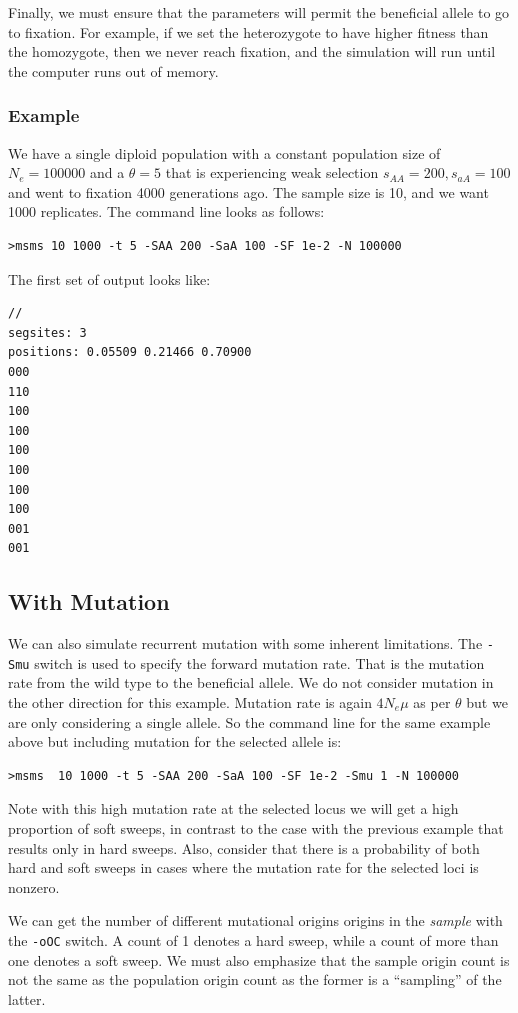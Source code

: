\documentclass{article}
\begin{document}
Finally, we must ensure that the parameters will permit the beneficial allele to
go to fixation. For example, if we set the heterozygote to have higher fitness
than the homozygote, then we never reach fixation, and the simulation will run
until the computer runs out of memory. 

\subsubsection{Example}
We have a single diploid population with a constant population size of
$N_e=100000$ and  a $\theta=5$ that is experiencing weak selection
$s_{AA}=200,s_{aA}=100$ and went to fixation 4000 generations ago. The sample
size is 10, and we want 1000 replicates. The command line looks as follows:
\begin{verbatim}
>msms 10 1000 -t 5 -SAA 200 -SaA 100 -SF 1e-2 -N 100000 
\end{verbatim}
The first set of output looks like:
\begin{verbatim}
//
segsites: 3
positions: 0.05509 0.21466 0.70900
000
110
100
100
100
100
100
100
001
001
\end{verbatim}

\subsection{With Mutation}

We can also simulate recurrent mutation with some inherent limitations. The
{\tt -Smu} switch is used to specify the forward mutation rate. That is the
mutation rate from the wild type to the beneficial allele. We do not consider
mutation in the other direction for this example. Mutation rate is again
$4N_e\mu$ as per $\theta$ but we are only considering a single allele. So the command line for
the same example above but including mutation for the selected allele is:
\begin{verbatim}
>msms  10 1000 -t 5 -SAA 200 -SaA 100 -SF 1e-2 -Smu 1 -N 100000 
\end{verbatim}
Note with this high mutation rate at the selected locus we will get a high
proportion of soft sweeps, in contrast to the case with the previous example
that results only in hard sweeps. Also, consider that there is a probability of
both hard and soft sweeps in cases where the mutation rate for the selected
loci is nonzero. 

We can get the number of different mutational origins origins in the {\it sample}
with the {\tt -oOC} switch. A count of 1 denotes a hard sweep, while a count of
more than one denotes a soft sweep. We must also emphasize that the sample origin
count is not the same as the population origin count as the former is a
``sampling'' of the latter.
\end{document}
